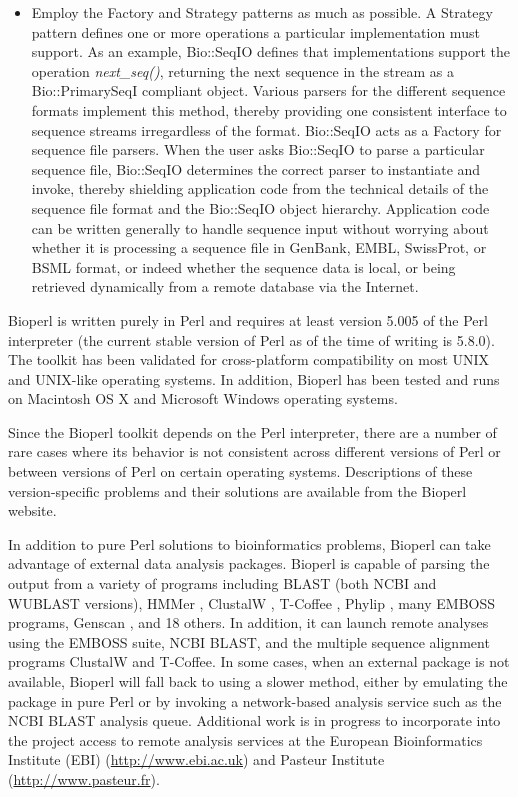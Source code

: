 \documentclass[12pt]{article}
\begin{document}
\begin{itemize}
\item Employ the Factory and Strategy patterns \cite{gangoffour} as
much as possible. A Strategy pattern defines one or more operations a
particular implementation must support. As an example, Bio::SeqIO
defines that implementations support the operation
\textit{next\_seq()}, returning the next sequence in the stream as a
Bio::PrimarySeqI compliant object. Various parsers for the different
sequence formats implement this method, thereby providing one
consistent interface to sequence streams irregardless of the format.
Bio::SeqIO acts as a Factory for sequence file parsers.  When the user
asks Bio::SeqIO to parse a particular sequence file, Bio::SeqIO
determines the correct parser to instantiate and invoke, thereby
shielding application code from the technical details of the sequence
file format and the Bio::SeqIO object hierarchy. Application code can
be written generally to handle sequence input without worrying about
whether it is processing a sequence file in GenBank, EMBL, SwissProt,
or BSML format, or indeed whether the sequence data is local, or being
retrieved dynamically from a remote database via the Internet.
\end{itemize}


Bioperl is written purely in Perl and requires at least version 5.005
of the Perl interpreter (the current stable version of Perl as of the
time of writing is 5.8.0).  The toolkit has been validated for
cross-platform compatibility on most UNIX and UNIX-like operating
systems.  In addition, Bioperl has been tested and runs on Macintosh
OS X and Microsoft Windows operating systems.  

Since the Bioperl toolkit depends on the Perl interpreter, there are a
number of rare cases where its behavior is not consistent across
different versions of Perl or between versions of Perl on certain
operating systems.  Descriptions of these version-specific problems
and their solutions are available from the Bioperl website.

In addition to pure Perl solutions to bioinformatics problems, Bioperl
can take advantage of external data analysis packages.  Bioperl is
capable of parsing the output from a variety of programs including BLAST (both
NCBI and WUBLAST \cite{wublast} versions), HMMer \cite{hmmer}, 
ClustalW \cite{clustalw}, T-Coffee \cite{tcoffee}, 
Phylip \cite{phylip}, many EMBOSS \cite{emboss} programs, 
Genscan \cite{genscan}, and 18 others.
In addition, it can launch remote analyses using the EMBOSS
suite, NCBI BLAST, and the multiple sequence alignment
programs ClustalW and T-Coffee.  In
some cases, when an external package is not available, Bioperl will
fall back to using a slower method, either by emulating the package in
pure Perl or by invoking a network-based analysis service such as the
NCBI BLAST analysis queue.  Additional work is in progress to
incorporate into the project access to remote analysis services at the
European Bioinformatics Institute (EBI) (\url{http://www.ebi.ac.uk}) and
Pasteur Institute (\url{http://www.pasteur.fr}).
\end{document}
